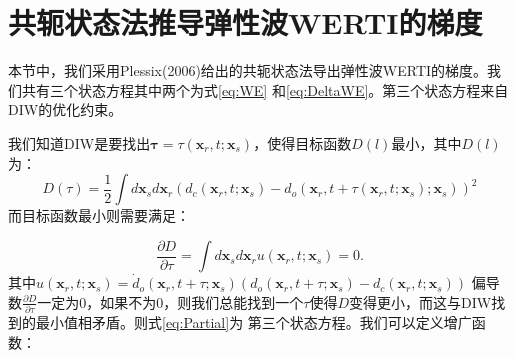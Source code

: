 \chapter{共轭状态法推导弹性波WERTI的梯度}
\label{cha:AdjointForEWERTI}
本节中，我们采用Plessix(2006)给出的共轭状态法导出弹性波WERTI的梯度。我们共有三个状态方程其中两个为式\eqref{eq:WE}
和\eqref{eq:DeltaWE}。第三个状态方程来自DIW的优化约束。

我们知道DIW是要找出$\mathbf{\tau}=\tau(\mathbf{x}_r,t;\mathbf{x}_s)$，使得目标函数$D(l)$最小，其中$D(l)$为：
\begin{equation}
	D(\tau)=\frac{1}{2}\int
	d\mathbf{x}_sd\mathbf{x}_r(d_c(\mathbf{x}_r,t;\mathbf{x}_s)-
	d_o(\mathbf{x}_r,t+\tau(\mathbf{x}_r,t;\mathbf{x}_s);\mathbf{x}_s))^2
        \label{eq:Dl}
\end{equation}
而目标函数最小则需要满足：

\begin{equation}
	\frac{\partial D}{\partial \tau}=\int
	d\mathbf{x}_sd\mathbf{x}_ru(\mathbf{x}_r,t;\mathbf{x}_s)=0.
        \label{eq:PartialD}
\end{equation}
其中$u(\mathbf{x}_r,t;\mathbf{x}_s)=\dot{d}_o(\mathbf{x}_r,t+\tau;\mathbf{x}_s)(d_o(\mathbf{x}_r,t+\tau;\mathbf{x}_s)-
d_c(\mathbf{x}_r,t;\mathbf{x}_s))$
偏导数$\frac{\partial D}{\partial
\tau}$一定为0，如果不为0，则我们总能找到一个$\tau$使得$D$变得更小，而这与DIW找到的最小值相矛盾。则式\eqref{eq:Partial}为
第三个状态方程。我们可以定义增广函数：



